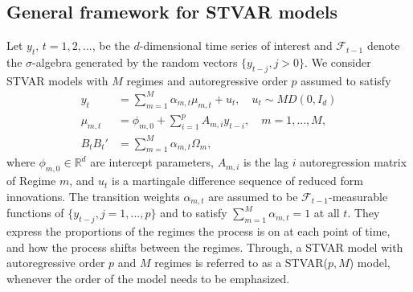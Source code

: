 \documentclass[nojss]{jss}
\begin{document}
\subsection{General framework for STVAR models}\label{sec:genstvar}
Let $y_t$, $t=1,2,...$, be the $d$-dimensional time series of interest and $\mathcal{F}_{t-1}$ denote the $\sigma$-algebra generated by the random vectors $\lbrace y_{t-j}, j>0 \rbrace$. We consider STVAR models with $M$ regimes and autoregressive order $p$ assumed to satisfy
\begin{align}
y_t &=\sum_{m=1}^M \alpha_{m,t}\mu_{m,t} + u_t, \quad u_{t} \sim MD(0, I_d)\label{eq:stvar1} \\
\mu_{m,t} &= \phi_{m,0} + \sum_{i=1}^{p}A_{m,i}y_{t-i}, \quad m=1,...,M,\label{eq:stvar2}\\
B_tB_t' &= \sum_{m=1}^M \alpha_{m,t}\Omega_m, \label{eq:stvar3}
\end{align}
where $\phi_{m,0}\in\mathbb{R}^{d}$ are intercept parameters, $A_{m,i}$ is the lag $i$ autoregression matrix  of Regime $m$, and $u_t$ is a martingale difference sequence of reduced form innovations. %
The transition weights $\alpha_{m,t}$ are assumed to be $\mathcal{F}_{t-1}$-measurable functions of $\lbrace y_{t-j}, j=1,...,p \rbrace$ and to satisfy $\sum_{m=1}^{M}\alpha_{m,t}=1$ at all $t$. They express the proportions of the regimes the process is on at each point of time, and how the process shifts between the regimes. Through, a STVAR model with autoregressive order $p$ and $M$ regimes is referred to as a STVAR($p,M$) model, whenever the order of the model needs to be emphasized.
\end{document}
